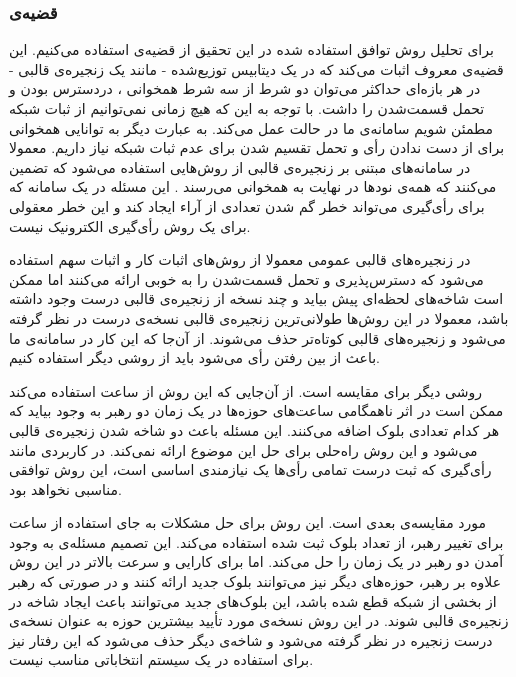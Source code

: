\subsubsection{قضیه‌ی }
برای تحلیل روش توافق استفاده شده در این تحقیق از قضیه‌ی  استفاده می‌کنیم. این قضیه‌ی معروف 
\cite{CAP}
اثبات می‌کند که در یک دیتابیس توزیع‌شده - مانند یک زنجیره‌ی قالبی - در هر بازه‌ای حداکثر می‌توان دو شرط از سه شرط همخوانی 
، دردسترس بودن 
و تحمل قسمت‌شدن
را داشت. با توجه به این که هیچ زمانی نمی‌توانیم از ثبات شبکه مطمئن شویم سامانه‌ی‌ ما در حالت  عمل می‌کند. به عبارت دیگر به توانایی همخوانی برای از دست ندادن رأی و تحمل تقسیم‌ شدن برای عدم ثبات شبکه نیاز داریم. معمولا در سامانه‌های مبتنی بر زنجیره‌ی قالبی از روش‌هایی استفاده می‌شود که تضمین می‌کنند که همه‌ی نودها در نهایت به همخوانی می‌رسند
.
این مسئله در یک سامانه که برای رأی‌گیری می‌تواند خطر گم شدن تعدادی از آراء ایجاد کند و این خطر معقولی برای یک‌ روش‌ رأی‌گیری الکترونیک نیست.
\par
در زنجیره‌ها‌ی قالبی‌ عمومی معمولا از روش‌های اثبات کار و اثبات‌ سهم استفاده می‌شود که دسترس‌پذیری و تحمل قسمت‌شدن را به خوبی ارائه می‌کنند اما ممکن است شاخه‌های
لحظه‌ای پیش بیاید و چند نسخه از زنجیره‌ی قالبی درست وجود داشته باشد، معمولا در این روش‌ها طولانی‌ترین زنجیره‌ی قالبی نسخه‌ی درست در نظر گرفته می‌شود و زنجیره‌های قالبی‌ کوتاه‌تر حذف می‌شوند. از آن‌جا که این کار در سامانه‌ی ما باعث از بین رفتن رأی‌ می‌شود باید از روشی دیگر استفاده کنیم.
\par
روشی دیگر  برای مقایسه 
\cite{Aura}
است. از آن‌جایی که این روش از ساعت  استفاده می‌کند ممکن است در اثر ناهمگامی ساعت‌های حوزه‌ها در یک زمان دو رهبر به وجود بیاید که هر کدام تعدادی بلوک اضافه می‌کنند. این مسئله باعث دو شاخه شدن زنجیره‌ی قالبی می‌شود و این روش راه‌حلی برای حل این موضوع ارائه نمی‌کند. در کاربردی مانند رأی‌گیری که ثبت درست تمامی رأی‌ها یک نیازمندی اساسی است، این روش توافقی مناسبی نخواهد بود.
\par
مورد مقایسه‌ی بعدی  
\cite{Clique}
است. این روش برای حل مشکلات  به جای استفاده از ساعت برای تغییر رهبر، از تعداد بلوک ثبت شده استفاده می‌کند. این تصمیم مسئله‌ی به وجود آمدن دو رهبر در یک زمان را حل می‌کند. اما برای کارایی و سرعت بالاتر در این روش علاوه بر رهبر، حوزه‌های دیگر نیز می‌توانند بلوک جدید ارائه کنند و در صورتی که رهبر از بخشی از شبکه قطع شده باشد، این بلوک‌های جدید می‌توانند باعث ایجاد شاخه در زنجیره‌ی قالبی شوند. در این روش نسخه‌ی مورد تأیید بیشترین حوزه به عنوان نسخه‌ی درست زنجیره در نظر گرفته می‌شود و شاخه‌ی دیگر حذف می‌شود که این رفتار نیز برای استفاده در یک سیستم انتخاباتی مناسب نیست. 
\par

